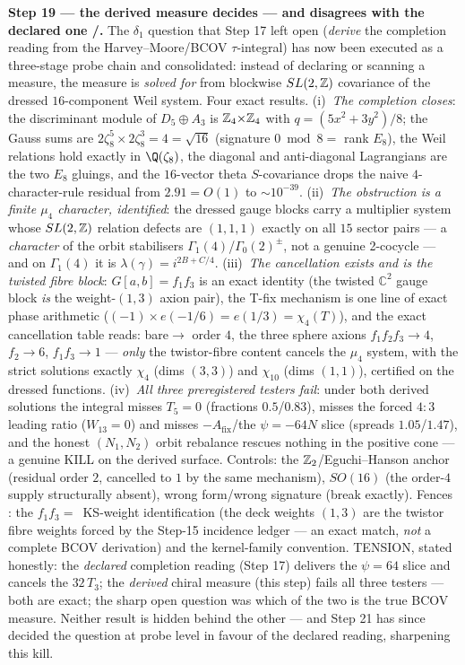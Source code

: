 \par\smallskip\noindent\textbf{Step 19 --- the derived measure decides --- and disagrees with the
declared one \mE/\mC.} The $\delta_1$ question that Step 17 left open (\emph{derive} the
completion reading from the Harvey--Moore/BCOV $\tau$-integral) has now been executed as a
three-stage probe chain and consolidated: instead of declaring or scanning a measure, the
measure is \emph{solved for} from blockwise $SL(2,\mathbb{Z})$ covariance of the dressed
$16$-component Weil system. Four exact results. (i)~\emph{The completion closes}: the
discriminant module of $D_5{\oplus}A_3$ is $\mathbb{Z}_4{\times}\mathbb{Z}_4$ with $q=(5x^2{+}3y^2)/8$; the
Gauss sums are $2\zeta_8^5\times2\zeta_8^3=4=\sqrt{16}$ (signature $0\bmod8=$ rank $E_8$), the
Weil relations hold exactly in $\Q(\zeta_8)$, the diagonal and anti-diagonal Lagrangians are
the two $E_8$ gluings, and the $16$-vector theta $S$-covariance drops the naive
$4$-character-rule residual from $2.91=O(1)$ to $\sim10^{-39}$. (ii)~\emph{The obstruction is
a finite $\mu_4$ character, identified}: the dressed gauge blocks carry a multiplier system
whose $SL(2,\mathbb{Z})$ relation defects are $(1,1,1)$ exactly on all $15$ sector pairs --- a
\emph{character} of the orbit stabilisers $\Gamma_1(4)$/$\Gamma_0(2)^\pm$, not a genuine
2-cocycle --- and on $\Gamma_1(4)$ it is $\lambda(\gamma)=i^{2B+C/4}$. (iii)~\emph{The
cancellation exists and is the twisted fibre block}: $G[a,b]=f_1f_3$ is an exact identity (the
twisted $\mathbb C^2$ gauge block \emph{is} the weight-$(1,3)$ axion pair), the T-fix
mechanism is one line of exact phase arithmetic ($(-1)\times e(-1/6)=e(1/3)=\chi_4(T)$), and
the exact cancellation table reads: bare${}\to$ order $4$, the three sphere axions
$f_1f_2f_3\to4$, $f_2\to6$, $f_1f_3\to1$ --- \emph{only} the twistor-fibre content cancels the
$\mu_4$ system, with the strict solutions exactly $\chi_4$ (dims $(3,3)$) and $\chi_{10}$
(dims $(1,1)$), certified on the dressed functions. (iv)~\emph{All three preregistered testers
fail}: under both derived solutions the integral misses $T_5=0$ (fractions $0.5$/$0.83$),
misses the forced $4{:}3$ leading ratio ($W_{13}=0$) and misses $-A_{\mathrm{fix}}$/the
$\psi=-64N$ slice (spreads $1.05$/$1.47$), and the honest $(N_1,N_2)$ orbit rebalance rescues
nothing in the positive cone --- a genuine KILL on the derived surface. Controls: the
$\mathbb{Z}_2$/Eguchi--Hanson anchor (residual order $2$, cancelled to $1$ by the same mechanism),
$SO(16)$ (the order-$4$ supply structurally absent), wrong form/wrong signature (break
exactly). Fences \mC: the $f_1f_3=$~KS-weight identification (the deck weights $(1,3)$ are the
twistor fibre weights forced by the Step-15 incidence ledger --- an exact match, \emph{not} a
complete BCOV derivation) and the kernel-family convention. TENSION, stated honestly: the
\emph{declared} completion reading (Step 17) delivers the $\psi=64$ slice and cancels the
$32\,T_3$; the \emph{derived} chiral measure (this step) fails all three testers --- both are
exact; the sharp open question was which of the two is the true BCOV measure. Neither result is
hidden behind the other --- and Step 21 has since decided the question at probe level in favour
of the declared reading, sharpening this kill.

